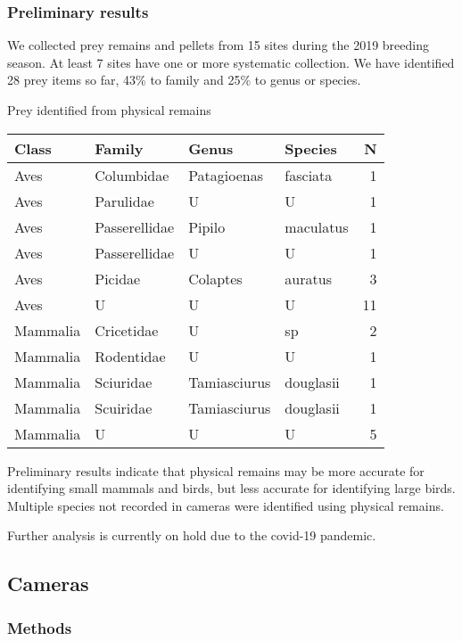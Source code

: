\documentclass[]{article}
\begin{document}
\subsubsection{Preliminary results}\label{preliminary-results}

We collected prey remains and pellets from 15 sites during the 2019
breeding season. At least 7 sites have one or more systematic
collection. We have identified 28 prey items so far, 43\% to family and
25\% to genus or species.

\begin{capctable}

\caption{\label{tab:unnamed-chunk-2}Prey identified from physical remains}
\centering
\begin{tabular}[t]{llllr}
\toprule
Class & Family & Genus & Species & N\\
\midrule
Aves & Columbidae & Patagioenas & fasciata & 1\\
Aves & Parulidae & U & U & 1\\
Aves & Passerellidae & Pipilo & maculatus & 1\\
Aves & Passerellidae & U & U & 1\\
Aves & Picidae & Colaptes & auratus & 3\\
\addlinespace
Aves & U & U & U & 11\\
Mammalia & Cricetidae & U & sp & 2\\
Mammalia & Rodentidae & U & U & 1\\
Mammalia & Sciuridae & Tamiasciurus & douglasii & 1\\
Mammalia & Scuiridae & Tamiasciurus & douglasii & 1\\
\addlinespace
Mammalia & U & U & U & 5\\
\bottomrule
\end{tabular}
\end{capctable}

Preliminary results indicate that physical remains may be more accurate
for identifying small mammals and birds, but less accurate for
identifying large birds. Multiple species not recorded in cameras were
identified using physical remains.

Further analysis is currently on hold due to the covid-19 pandemic.

\subsection{Cameras}\label{cameras}

\subsubsection{Methods}\label{methods}
\end{document}
